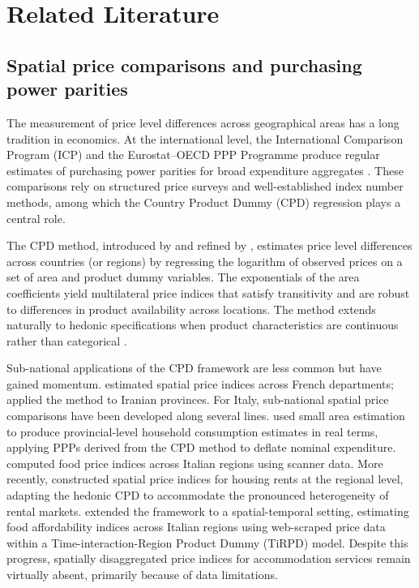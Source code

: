 \documentclass[12pt,a4paper]{article}
\begin{document}
\section{Related Literature}
\label{sec:literature}

\subsection{Spatial price comparisons and purchasing power parities}

The measurement of price level differences across geographical areas has a long tradition in economics. At the international level, the International Comparison Program (ICP) and the Eurostat--OECD PPP Programme produce regular estimates of purchasing power parities for broad expenditure aggregates \citep{eurostat_oecd2012, worldbank2020icp}. These comparisons rely on structured price surveys and well-established index number methods, among which the Country Product Dummy (CPD) regression plays a central role.

The CPD method, introduced by \citet{summers1973} and refined by \citet{rao2005equivalence}, estimates price level differences across countries (or regions) by regressing the logarithm of observed prices on a set of area and product dummy variables. The exponentials of the area coefficients yield multilateral price indices that satisfy transitivity and are robust to differences in product availability across locations. The method extends naturally to hedonic specifications when product characteristics are continuous rather than categorical \citep{silver2009hedonic, diewert2010hedonic}.

Sub-national applications of the CPD framework are less common but have gained momentum. \citet{breton2015spatial} estimated spatial price indices across French departments; \citet{majari2017spatial} applied the method to Iranian provinces. For Italy, sub-national spatial price comparisons have been developed along several lines. \citet{biggeri2017provincial} used small area estimation to produce provincial-level household consumption estimates in real terms, applying PPPs derived from the CPD method to deflate nominal expenditure. \citet{laureti2020spatial} computed food price indices across Italian regions using scanner data. More recently, \citet{biggeri2022housing} constructed spatial price indices for housing rents at the regional level, adapting the hedonic CPD to accommodate the pronounced heterogeneity of rental markets. \citet{laureti2024food} extended the framework to a spatial-temporal setting, estimating food affordability indices across Italian regions using web-scraped price data within a Time-interaction-Region Product Dummy (TiRPD) model. Despite this progress, spatially disaggregated price indices for accommodation services remain virtually absent, primarily because of data limitations.
\end{document}
